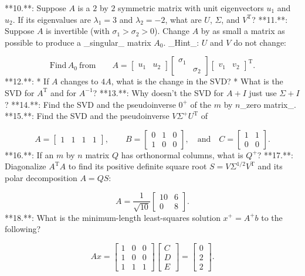 

**10.**: Suppose \(A\) is a \(2\) by \(2\) symmetric matrix with unit eigenvectors \(u_{1}\) and \(u_{2}\). If its eigenvalues are \(\lambda_{1}=3\) and \(\lambda_{2}=-2\), what are \(U\), \(\Sigma\), and \(V^{\mathrm{T}}\)?
**11.**: Suppose \(A\) is invertible (with \(\sigma_{1}>\sigma_{2}>0\)). Change \(A\) by as small a matrix as possible to produce a _singular_ matrix \(A_{0}\). _Hint_: \(U\) and \(V\) do not change:

\[\mathrm{Find}\,A_{0}\ \mathrm{from}\qquad A=\begin{bmatrix}u_{1}&u_{2}\end{bmatrix} \begin{bmatrix}\sigma_{1}&\\ &\sigma_{2}\end{bmatrix}\begin{bmatrix}v_{1}&v_{2}\end{bmatrix}^{\mathrm{T}}.\]
**12.**:
* If \(A\) changes to \(4A\), what is the change in the SVD?
* What is the SVD for \(A^{\mathrm{T}}\) and for \(A^{-1}\)?
**13.**: Why doesn't the SVD for \(A+I\) just use \(\Sigma+I\)?
**14.**: Find the SVD and the pseudoinverse \(0^{+}\) of the \(m\) by \(n\)_zero matrix_.
**15.**: Find the SVD and the pseudoinverse \(V\Sigma^{+}U^{\mathrm{T}}\) of

\[A=\begin{bmatrix}1&1&1&1\end{bmatrix},\qquad B=\begin{bmatrix}0&1&0\\ 1&0&0\end{bmatrix},\quad\mathrm{and}\quad C=\begin{bmatrix}1&1\\ 0&0\end{bmatrix}.\]
**16.**: If an \(m\) by \(n\) matrix \(Q\) has orthonormal columns, what is \(Q^{+}\)?
**17.**: Diagonalize \(A^{\mathrm{T}}A\) to find its positive definite square root \(S=V\Sigma^{1/2}V^{\mathrm{T}}\) and its polar decomposition \(A=QS\):

\[A=\frac{1}{\sqrt{10}}\begin{bmatrix}10&6\\ 0&8\end{bmatrix}.\]
**18.**: What is the minimum-length least-squares solution \(x^{+}=A^{+}b\) to the following?

\[Ax=\begin{bmatrix}1&0&0\\ 1&0&0\\ 1&1&1\end{bmatrix}\begin{bmatrix}C\\ D\\ E\end{bmatrix}=\begin{bmatrix}0\\ 2\\ 2\end{bmatrix}.\]

